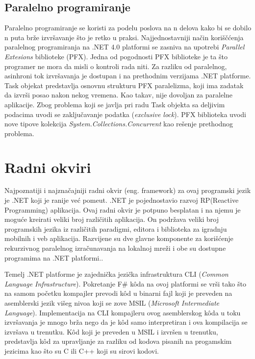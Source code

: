 \documentclass[a4paper]{article}
\begin{document}
\subsection{Paralelno programiranje}

Paralelno programiranje se koristi za podelu poslova na n delova kako bi se dobilo n puta brže izvršavanje što je retko u praksi. Najjednostavniji način koriščćenja paralelnog programiranja na .NET 4.0 platformi se zasniva na upotrebi {\em Parallel Extesions} biblioteke (PFX)\cite{progFs}. Jedna od pogodnosti PFX biblioteke je ta što programer ne mora da misli o kontroli rada niti. Za razliku od paralelnog, asinhroni tok izvršavanja je dostupan i na prethodnim verzijama .NET platforme. Task objekat predstavlja osnovnu strukturu PFX paralelizma, koji ima zadatak da izvrši posao nakon nekog vremena. Kao takav, nije dovoljan za paralelne aplikacije. Zbog problema koji se javlja pri radu Task objekta sa deljivim podacima uvodi se zaključavanje podatka ({\em exclusive lock}). PFX biblioteka uvodi nove tipove kolekcija {\em System.Collections.Concurrent} \cite{sysCC} kao rešenje prethodnog problema.  


\section{Radni okviri}

Najpoznatiji i najznačajniji radni okvir (eng. framework) za ovaj programski jezik je .NET koji je ranije već pomeut. .NET je pojednostavio razvoj RP(Reactive Programming)\cite{RPapp} aplikacija. Ovaj radni okvir je potpuno besplatan i na njemu je moguće kreirati veliki broj različitih aplikacija. On podržava veliki broj programskih jezika iz različitih paradigmi, editora i biblioteka za igradnju mobilnih i veb aplikacija. Razvijene su dve glavne komponente za korišćenje rekurzivnog paralelnog izračunavanja na lokalnoj mreži i obe su dostupne programima na .NET platformi.\cite{ppNETframework}. 

Temelj .NET platforme je zajednička jezička infrastruktura CLI ({\em Common Language Infrastructure})\cite{cli}. Pokretanje F\# kôda na ovoj platformi se vrši tako što na samom početku kompajler prevodi kôd u binarni fajl koji je preveden na asemblerski jezik višeg nivoa koji se zove MSIL ({\em Microsoft Intermediate Language})\cite{msil}. Implementacija na CLI kompajleru ovog asemblerskog kôda u toku izvršavanja je mnogo brža nego da je kôd samo interpretiran i ova kompilacija se izvršava u trenutku\cite{progFs}.
Kôd koji je preveden u MSIL i izvršen u trenutku, predstavlja kôd za upravljanje za razliku od kodova pisanih na progamskim jezicima kao što su C ili C++ koji su sirovi kodovi.   
\end{document}
